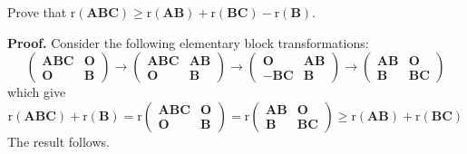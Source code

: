 \documentclass[12pt, a4paper, oneside]{book}
\begin{document}
\begin{theorem}
    Prove that $\mathrm{r}(\mathbf{A} \mathbf{B} \mathbf{C}) \geq \mathrm{r}({\mathbf{A} \mathbf{B}})+\mathrm{r}(\mathbf{B} \mathbf{C})-\mathrm{r}(\mathbf{B})$.

    \textbf{Proof.} Consider the following elementary block transformations:
    \[
        \left(\begin{array}{cc}
                \mathbf{A} \mathbf{B} \mathbf{C} & \mathbf{O} \\
                \mathbf{O}                       & \mathbf{B}
            \end{array}\right) \rightarrow\left(\begin{array}{cc}
                \mathbf{A} \mathbf{B} \mathbf{C} & \mathbf{A} \mathbf{B} \\
                \mathbf{O}                       & \mathbf{B}
            \end{array}\right) \rightarrow\left(\begin{array}{cc}
                \mathbf{O}             & \mathbf{A} \mathbf{B} \\
                -\mathbf{B} \mathbf{C} & \mathbf{B}
            \end{array}\right) \rightarrow\left(\begin{array}{cc}
                \mathbf{A} \mathbf{B} & \mathbf{O}            \\
                \mathbf{B}            & \mathbf{B} \mathbf{C}
            \end{array}\right)
    \]
    which give
    \[
        \mathrm{r}(\mathbf{A} \mathbf{B} \mathbf{C})+\mathrm{r}(\mathbf{B})=\mathrm{r}\left(\begin{array}{cc}
                \mathbf{A} \mathbf{B} \mathbf{C} & \mathbf{O} \\
                \mathbf{O}                       & \mathbf{B}
            \end{array}\right)=\mathrm{r}\left(\begin{array}{cc}
                \mathbf{A} \mathbf{B} & \mathbf{O}            \\
                \mathbf{B}            & \mathbf{B} \mathbf{C}
            \end{array}\right) \geq \mathrm{r}(\mathbf{A} \mathbf{B})+\mathrm{r}({\mathbf{B} \mathbf{C}})
    \]
    The result follows.
\end{theorem}
\end{document}
